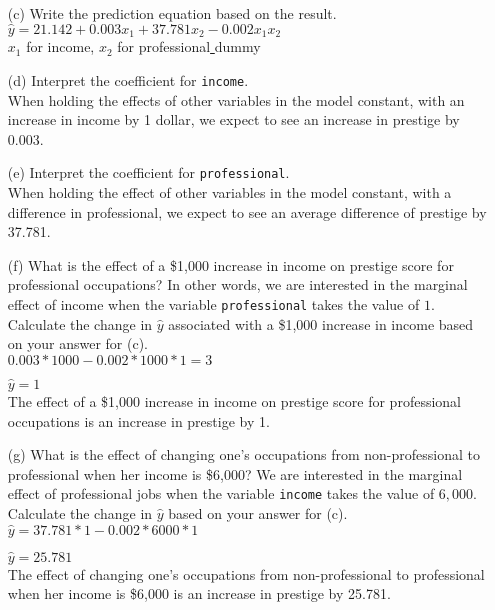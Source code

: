 \documentclass[12pt,letterpaper]{article}
\begin{document}
\begin{enumerate}
	\vspace{6cm}
	\item [(c)]
	Write the prediction equation based on the result.\\
	 $  \hat{y} = 21.142 +  0.003x_{1} + 37.781x_{2} -0.002x_{1}x_{2}  $\\		
	 $x_{1}$ for income, $x_{2}$  for  professional\underline{ }dummy 
	
\newpage
	\item [(d)]
	Interpret the coefficient for \texttt{income}.\\
	When holding the effects of other variables in the model constant, with an increase in income by 1 dollar, we expect to see an increase in prestige by 0.003.  
	
	\vspace{10cm}	
	\item [(e)]
	Interpret the coefficient for \texttt{professional}.\\
	When holding the effect of other variables in the model constant, with a difference in professional, we expect to see an average difference of prestige by 37.781.  
	
	\newpage
	\item [(f)]
	What is the effect of a \$1,000 increase in income on prestige score for professional occupations? In other words, we are interested in the marginal effect of income when the variable \texttt{professional} takes the value of $1$. Calculate the change in $\hat{y}$ associated with a \$1,000 increase in income based on your answer for (c).\\
	$ 0.003 * 1000 - 0.002*1000*1 = 3 $
	
	$\hat{y} = 1 $\\
	The effect of a \$1,000 increase in income on prestige score for professional occupations is an increase in prestige by 1.
	\vspace{10cm}
	
	
	\item [(g)]
	What is the effect of changing one's occupations from non-professional to professional when her income is \$6,000? We are interested in the marginal effect of professional jobs when the variable \texttt{income} takes the value of $6,000$. Calculate the change in $\hat{y}$ based on your answer for (c).\\
		$\hat{y} = 37.781 * 1 - 0.002 * 6000 *1 $
	
	$\hat{y} =  25.781 $\\
	The effect of changing one's occupations from non-professional to professional when her income is \$6,000 is an increase in prestige by 25.781.
	
	
\end{enumerate}
\end{document}
